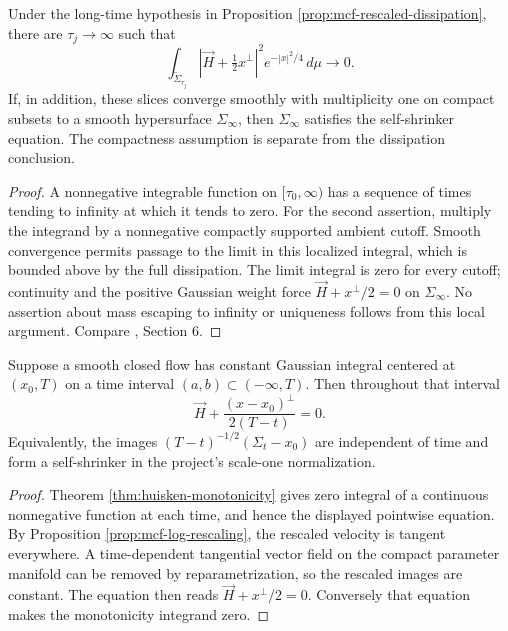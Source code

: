 \begin{corollary}\label{cor:mcf-small-dissipation-times}
Under the long-time hypothesis in Proposition \ref{prop:mcf-rescaled-dissipation}, there are $\tau_j\to\infty$ such that
\[
 \int_{\widetilde\Sigma_{\tau_j}}
 \left|\vec H+\tfrac12x^\perp\right|^2e^{-|x|^2/4}\,d\mu\longrightarrow0.
\]
If, in addition, these slices converge smoothly with multiplicity one on compact subsets to a smooth hypersurface $\Sigma_\infty$, then $\Sigma_\infty$ satisfies the self-shrinker equation. The compactness assumption is separate from the dissipation conclusion.
\end{corollary}
\begin{proof}
A nonnegative integrable function on $[\tau_0,\infty)$ has a sequence of times tending to infinity at which it tends to zero. For the second assertion, multiply the integrand by a nonnegative compactly supported ambient cutoff. Smooth convergence permits passage to the limit in this localized integral, which is bounded above by the full dissipation. The limit integral is zero for every cutoff; continuity and the positive Gaussian weight force $\vec H+x^\perp/2=0$ on $\Sigma_\infty$. No assertion about mass escaping to infinity or uniqueness follows from this local argument. Compare \cite{WhiMCF15}, Section 6.
\end{proof}

\begin{proposition}\label{prop:mcf-monotonicity-equality}
Suppose a smooth closed flow has constant Gaussian integral centered at $(x_0,T)$ on a time interval $(a,b)\subset(-\infty,T)$. Then throughout that interval
\[
 \vec H+\frac{(x-x_0)^\perp}{2(T-t)}=0.
\]
Equivalently, the images $(T-t)^{-1/2}(\Sigma_t-x_0)$ are independent of time and form a self-shrinker in the project's scale-one normalization.
\end{proposition}
\begin{proof}
Theorem \ref{thm:huisken-monotonicity} gives zero integral of a continuous nonnegative function at each time, and hence the displayed pointwise equation. By Proposition \ref{prop:mcf-log-rescaling}, the rescaled velocity is tangent everywhere. A time-dependent tangential vector field on the compact parameter manifold can be removed by reparametrization, so the rescaled images are constant. The equation then reads $\vec H+x^\perp/2=0$. Conversely that equation makes the monotonicity integrand zero.
\end{proof}

